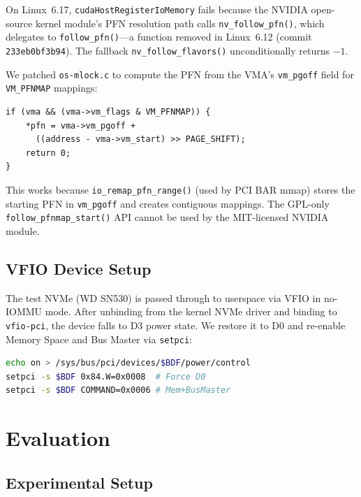 \documentclass{article}
\begin{document}
On Linux~6.17, \texttt{cudaHostRegisterIoMemory} fails because the NVIDIA
open-source kernel module's PFN resolution path calls
\texttt{nv\_follow\_pfn()}, which delegates to \texttt{follow\_pfn()}---a
function removed in Linux~6.12 (commit \texttt{233eb0bf3b94}). The fallback
\texttt{nv\_follow\_flavors()} unconditionally returns $-1$.

We patched \texttt{os-mlock.c} to compute the PFN from the VMA's
\texttt{vm\_pgoff} field for \texttt{VM\_PFNMAP} mappings:

\begin{lstlisting}[caption={NVIDIA driver PFN resolution patch},label={lst:patch}]
if (vma && (vma->vm_flags & VM_PFNMAP)) {
    *pfn = vma->vm_pgoff +
      ((address - vma->vm_start) >> PAGE_SHIFT);
    return 0;
}
\end{lstlisting}

This works because \texttt{io\_remap\_pfn\_range()} (used by PCI BAR mmap)
stores the starting PFN in \texttt{vm\_pgoff} and creates contiguous mappings.
The GPL-only \texttt{follow\_pfnmap\_start()} API cannot be used by the MIT-licensed
NVIDIA module.

\subsection{VFIO Device Setup}

The test NVMe (WD SN530) is passed through to userspace via VFIO in
no-IOMMU mode. After unbinding from the kernel NVMe driver and binding to
\texttt{vfio-pci}, the device falls to D3 power state. We restore it to D0
and re-enable Memory Space and Bus Master via \texttt{setpci}:

\begin{lstlisting}[language=bash,caption={VFIO setup and power state recovery}]
echo on > /sys/bus/pci/devices/$BDF/power/control
setpci -s $BDF 0x84.W=0x0008  # Force D0
setpci -s $BDF COMMAND=0x0006 # Mem+BusMaster
\end{lstlisting}

\section{Evaluation}
\label{sec:eval}

\subsection{Experimental Setup}
\end{document}
